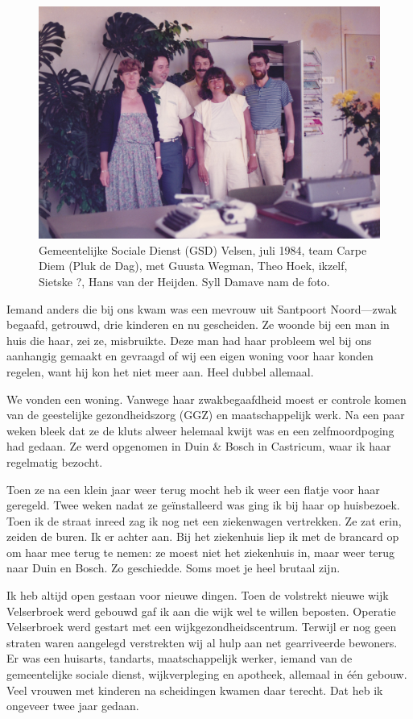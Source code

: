 \documentclass[10pt,twoside, openright]{memoir}
\begin{document}
\begin{figure}
\includegraphics[width=\textwidth]{img/ch46/crew}
\caption*{\footnotesize Gemeentelijke Sociale Dienst (GSD) Velsen, juli 1984, team Carpe Diem (Pluk de Dag), met Guusta Wegman, Theo Hoek, ikzelf, Sietske ?, Hans van der Heijden. Syll Damave nam de foto.}
\end{figure}

Iemand anders die bij ons kwam was een mevrouw uit Santpoort Noord---zwak begaafd, getrouwd, drie kinderen en nu gescheiden. Ze woonde bij een man in huis die haar, zei ze, misbruikte. Deze man had haar probleem wel bij ons aanhangig gemaakt en gevraagd of wij een eigen woning voor haar konden regelen, want hij kon het niet meer aan. Heel dubbel allemaal. 

We vonden een woning. Vanwege haar zwakbegaafdheid moest er controle komen van de geestelijke gezondheidszorg (GGZ) en maatschappelijk werk. Na een paar weken bleek dat ze de kluts alweer helemaal kwijt was en een zelfmoordpoging had gedaan. Ze werd opgenomen in Duin \& Bosch in Castricum, waar ik haar regelmatig bezocht. 

Toen ze na een klein jaar weer terug mocht heb ik weer een flatje voor haar geregeld. Twee weken nadat ze geïnstalleerd was ging ik bij haar op huisbezoek. Toen ik de straat inreed zag ik nog net een ziekenwagen vertrekken. Ze zat erin, zeiden de buren. Ik er achter aan. Bij het ziekenhuis liep ik met de brancard op om haar mee terug te nemen: ze moest niet het ziekenhuis in, maar weer terug naar Duin en Bosch. Zo geschiedde. Soms moet je heel brutaal zijn.

Ik heb altijd open gestaan voor nieuwe dingen. Toen de volstrekt nieuwe wijk Velserbroek werd gebouwd gaf ik aan die wijk wel te willen beposten. Operatie Velserbroek werd gestart met een wijkgezondheidscentrum. Terwijl er nog geen straten waren aangelegd verstrekten wij al hulp aan net gearriveerde bewoners. Er was een huisarts, tandarts, maatschappelijk werker, iemand van de gemeentelijke sociale dienst, wijkverpleging en apotheek, allemaal in één gebouw. Veel vrouwen met kinderen na scheidingen kwamen daar terecht. Dat heb ik ongeveer twee jaar gedaan. 
\end{document}
